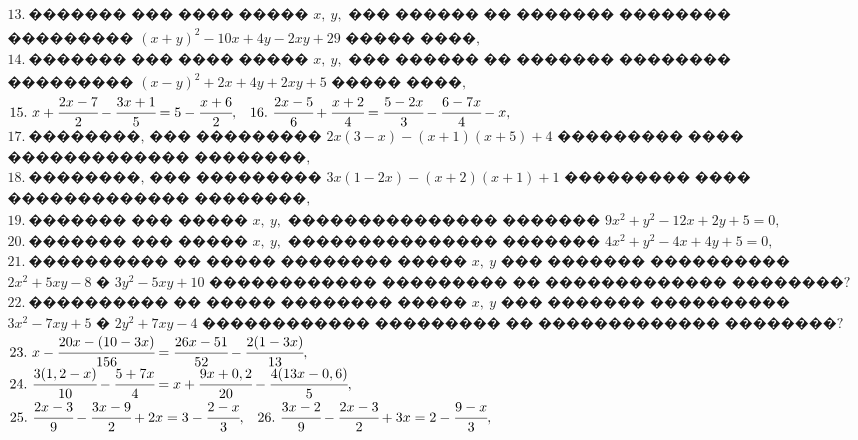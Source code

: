 \documentclass[12pt]{article}
\begin{document}
$\begin{array}{l}
13.\ \text{������� ��� ���� ����� }x,\ y, \text{ ��� ������ �� ������� ��������}\\
\text{��������� }(x+y)^2-10x+4y-2xy+29\text{ ����� ����,}\\
14.\ \text{������� ��� ���� ����� }x,\ y, \text{ ��� ������ �� ������� ��������}\\
\text{��������� }(x-y)^2+2x+4y+2xy+5\text{ ����� ����,}
\end{array}$\\
$\begin{array}{ll}
15.\ x+\cfrac{2x-7}{2}-\cfrac{3x+1}{5}=5-\cfrac{x+6}{2},&
16.\ \cfrac{2x-5}{6}+\cfrac{x+2}{4}=\cfrac{5-2x}{3}-\cfrac{6-7x}{4}-x,
\end{array}$\\
$\begin{array}{l}
17.\ \text{��������, ��� ��������� }2x(3-x)-(x+1)(x+5)+4
\text{ ��������� ����}\\ \text{������������� ��������,}\\
18.\ \text{��������, ��� ��������� }3x(1-2x)-(x+2)(x+1)+1
\text{ ��������� ����}\\ \text{������������� ��������,}\\
19.\ \text{������� ��� ����� }x,\ y,\text{ ��������������� ������� } 9x^2+y^2-12x+2y+5=0,\\
20.\ \text{������� ��� ����� }x,\ y,\text{ ��������������� ������� } 4x^2+y^2-4x+4y+5=0,\\
21.\ \text{���������� �� ����� �������� ����� }x,\ y \text{ ��� ������� ���������� }\\
2x^2+5xy-8\text{ � } 3y^2-5xy+10\text{ ������������ ��������� �� ������������� ��������?}\\
22.\ \text{���������� �� ����� �������� ����� }x,\ y \text{ ��� ������� ���������� }\\
3x^2-7xy+5\text{ � } 2y^2+7xy-4\text{ ������������ ��������� �� ������������� ��������?}
\end{array}$\\
$\begin{array}{ll}
23.\ x-\cfrac{20x-(10-3x)}{156}=\cfrac{26x-51}{52}-\cfrac{2(1-3x)}{13},\\
24.\ \cfrac{3(1,2-x)}{10}-\cfrac{5+7x}{4}=x+\cfrac{9x+0,2}{20}-\cfrac{4(13x-0,6)}{5},\end{array}$\\
$\begin{array}{ll}25.\ \cfrac{2x-3}{9}-\cfrac{3x-9}{2}+2x=3-\cfrac{2-x}{3},&
26.\ \cfrac{3x-2}{9}-\cfrac{2x-3}{2}+3x=2-\cfrac{9-x}{3},
\end{array}$\\
\end{document}
